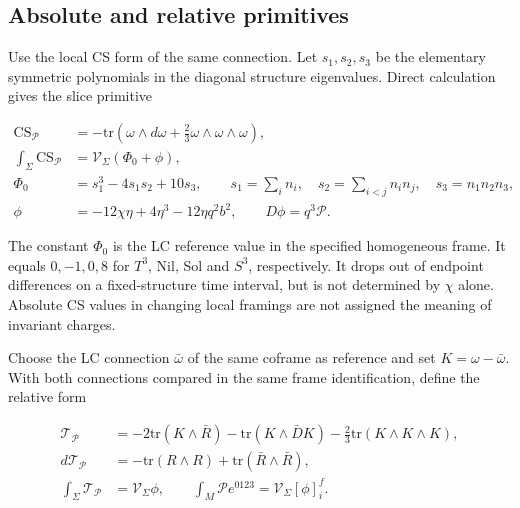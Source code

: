 \subsection{Absolute and relative primitives}

Use the local CS form of the same connection. Let $s_1,s_2,s_3$ be the elementary symmetric polynomials in the diagonal structure eigenvalues. Direct calculation gives the slice primitive

\begin{equation}\tag{D-05}\label{eq:D-05}
\begin{aligned}
\mathrm{CS}_{\mathcal P}&=-\mathrm{tr}(\omega\wedge d\omega+\tfrac23\omega\wedge\omega\wedge\omega),\\
\int_{\Sigma}\mathrm{CS}_{\mathcal P}&=\mathcal V_{\Sigma}(\Phi_0+\phi),\\
\Phi_0&=s_1^3-4s_1s_2+10s_3,\qquad
s_1=\sum_i n_i,\quad s_2=\sum_{i<j}n_in_j,\quad s_3=n_1n_2n_3,\\
\phi&=-12\chi\eta+4\eta^3-12\eta q^2b^2,\qquad
D\phi=q^3\mathcal P.
\end{aligned}
\end{equation}

The constant $\Phi_0$ is the LC reference value in the specified homogeneous frame. It equals $0,-1,0,8$ for $T^3$, Nil, Sol and $S^3$, respectively. It drops out of endpoint differences on a fixed-structure time interval, but is not determined by $\chi$ alone. Absolute CS values in changing local framings are not assigned the meaning of invariant charges.

Choose the LC connection $\bar\omega$ of the same coframe as reference and set $K=\omega-\bar\omega$. With both connections compared in the same frame identification, define the relative form

\begin{equation}\tag{D-06}\label{eq:D-06}
\begin{aligned}
\mathcal T_{\mathcal P}&=-2\mathrm{tr}(K\wedge\bar R)-\mathrm{tr}(K\wedge\bar D K)
-\tfrac23\mathrm{tr}(K\wedge K\wedge K),\\
d\mathcal T_{\mathcal P}&=-\mathrm{tr}(R\wedge R)+\mathrm{tr}(\bar R\wedge\bar R),\\
\int_{\Sigma}\mathcal T_{\mathcal P}&=\mathcal V_{\Sigma}\phi,\qquad
\int_M\mathcal P e^{0123}=\mathcal V_{\Sigma}[\phi]_i^f.
\end{aligned}
\end{equation}


